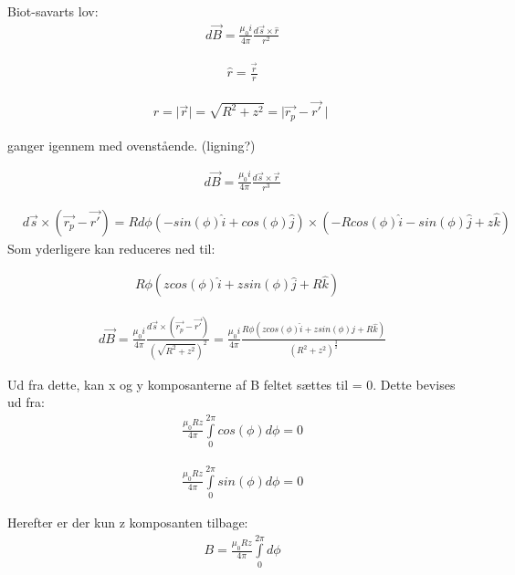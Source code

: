 Biot-savarts lov:
\begin{align}
	&d\vec{B}=\frac{\mu_0  i}{4\pi} \frac{d\vec{s} \times \hat{r}}{r^2}
\end{align}

\begin{align}
	&\hat{r}=\frac{\vec{r}}{r}
\end{align}

\begin{align}
	&r= \mid \vec{r} \mid = \sqrt{R^2+z^2}=\mid \vec{r_p}-\vec{r'} \mid
\end{align}



ganger igennem med ovenstående. (ligning?)

\begin{align}
	&d\vec{B}=\frac{\mu_0 i}{4\pi} \frac{d\vec{s} \times \vec{r}}{r^3}
\end{align}

	
\begin{align}
	&d\vec{s}\times(\vec{r_p}-\vec{r'})=R d\phi (-sin(\phi)\hat{i}+cos(\phi)\hat{j})\times (-R cos(\phi)\hat{i}-sin(\phi)\hat{j}+z\hat{k})
\end{align}	
Som yderligere kan reduceres ned til:

\begin{align}
	R \phi (z cos(\phi)\hat{i}+z sin(\phi)\hat{j}+R\hat{k})
\end{align}

\begin{align}
	&d\vec{B}=\frac{\mu_0 i}{4\pi} \frac{d\vec{s}\times (\vec{r_p}-\vec{r'})}{(\sqrt{R^2+z^2})^2}=\frac{\mu_0 i}{4\pi} \frac{R \phi (z cos(\phi)\hat{i}+z sin(\phi)\hat{j}+R\hat{k})}{(R^2+z^2)^\frac{3}{2}}
\end{align}


Ud fra dette, kan x og y komposanterne af B feltet sættes til = 0. Dette bevises ud fra:
\begin{align}
	&\frac{\mu_0 R z}{4\pi} \int\limits_{0}^{2\pi}cos(\phi)d\phi = 0
\end{align}


\begin{align}
	&\frac{\mu_0 R z}{4\pi} \int\limits_{0}^{2\pi}sin(\phi)d\phi = 0
\end{align}

Herefter er der kun z komposanten tilbage:
\begin{align}
	&B=\frac{\mu_0 R z}{4\pi} \int\limits_{0}^{2\pi}d\phi
\end{align}

